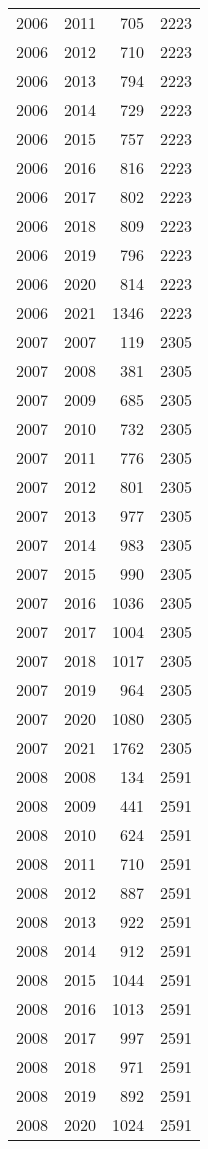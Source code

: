 \documentclass[
  11pt,
  letterpaper,
  DIV=11,
  numbers=noendperiod,
  twoside]{scrartcl}
\begin{document}
\begin{longtable}[]{@{}rrrr@{}}
2006 & 2011 & 705 & 2223 \\
2006 & 2012 & 710 & 2223 \\
2006 & 2013 & 794 & 2223 \\
2006 & 2014 & 729 & 2223 \\
2006 & 2015 & 757 & 2223 \\
2006 & 2016 & 816 & 2223 \\
2006 & 2017 & 802 & 2223 \\
2006 & 2018 & 809 & 2223 \\
2006 & 2019 & 796 & 2223 \\
2006 & 2020 & 814 & 2223 \\
2006 & 2021 & 1346 & 2223 \\
2007 & 2007 & 119 & 2305 \\
2007 & 2008 & 381 & 2305 \\
2007 & 2009 & 685 & 2305 \\
2007 & 2010 & 732 & 2305 \\
2007 & 2011 & 776 & 2305 \\
2007 & 2012 & 801 & 2305 \\
2007 & 2013 & 977 & 2305 \\
2007 & 2014 & 983 & 2305 \\
2007 & 2015 & 990 & 2305 \\
2007 & 2016 & 1036 & 2305 \\
2007 & 2017 & 1004 & 2305 \\
2007 & 2018 & 1017 & 2305 \\
2007 & 2019 & 964 & 2305 \\
2007 & 2020 & 1080 & 2305 \\
2007 & 2021 & 1762 & 2305 \\
2008 & 2008 & 134 & 2591 \\
2008 & 2009 & 441 & 2591 \\
2008 & 2010 & 624 & 2591 \\
2008 & 2011 & 710 & 2591 \\
2008 & 2012 & 887 & 2591 \\
2008 & 2013 & 922 & 2591 \\
2008 & 2014 & 912 & 2591 \\
2008 & 2015 & 1044 & 2591 \\
2008 & 2016 & 1013 & 2591 \\
2008 & 2017 & 997 & 2591 \\
2008 & 2018 & 971 & 2591 \\
2008 & 2019 & 892 & 2591 \\
2008 & 2020 & 1024 & 2591 \\

\end{longtable}
\end{document}
